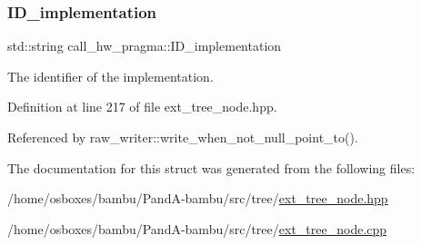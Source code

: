\mbox{\label{structcall__hw__pragma_a420eeea869b9623157a768639e631224}} 
\subsubsection{\texorpdfstring{I\+D\+\_\+implementation}{ID\_implementation}}
{\footnotesize\ttfamily std\+::string call\+\_\+hw\+\_\+pragma\+::\+I\+D\+\_\+implementation}



The identifier of the implementation. 



Definition at line 217 of file ext\+\_\+tree\+\_\+node.\+hpp.



Referenced by raw\+\_\+writer\+::write\+\_\+when\+\_\+not\+\_\+null\+\_\+point\+\_\+to().



The documentation for this struct was generated from the following files\+:\begin{DoxyCompactItemize}
\item 
/home/osboxes/bambu/\+Pand\+A-\/bambu/src/tree/\hyperlink{ext__tree__node_8hpp}{ext\+\_\+tree\+\_\+node.\+hpp}\item 
/home/osboxes/bambu/\+Pand\+A-\/bambu/src/tree/\hyperlink{ext__tree__node_8cpp}{ext\+\_\+tree\+\_\+node.\+cpp}\end{DoxyCompactItemize}
